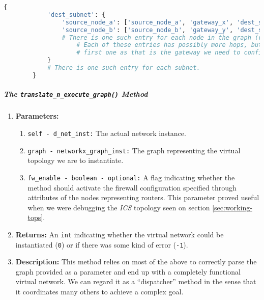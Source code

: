     \begin{lstlisting}[language = python, caption = Data structure containing all the network's routes., label = last:route-dict]
        {
            'dest_subnet': {
                'source_node_a': ['source_node_a', 'gateway_x', 'dest_subnet_bridge'],
                'source_node_b': ['source_node_b', 'gateway_y', 'dest_subnet_bridge'],
                # There is one such entry for each node in the graph (routers, bridges and hosts).
                    # Each of these entries has possibly more hops, but we are only interested in the
                    # first one as that is the gateway we need to configure.
            }
            # There is one such entry for each subnet.
        }
    \end{lstlisting}

    \subparagraph{The \texttt{translate\_n\_execute\_graph()} Method}
        \begin{enumerate}
            \item \textbf{Parameters:}
            \begin{enumerate}
                \item \texttt{self - d\_net\_inst:} The actual network instance.
                \item \texttt{graph - networkx\_graph\_inst:} The graph representing the virtual topology we are to instantiate.
                \item \texttt{fw\_enable - boolean - optional:} A flag indicating whether the method should activate the firewall configuration specified through attributes of the nodes representing routers. This parameter proved useful when we were debugging the \textit{ICS} topology seen on section \ref{sec:working-tops}.
            \end{enumerate}
            \item \textbf{Returns:} An \texttt{int} indicating whether the virtual network could be instantiated (\texttt{0}) or if there was some kind of error (\texttt{-1}).
            \item \textbf{Description:} This method relies on most of the above to correctly parse the graph provided as a parameter and end up with a completely functional virtual network. We can regard it as a ``dispatcher'' method in the sense that it coordinates many others to achieve a complex goal.
        \end{enumerate}

